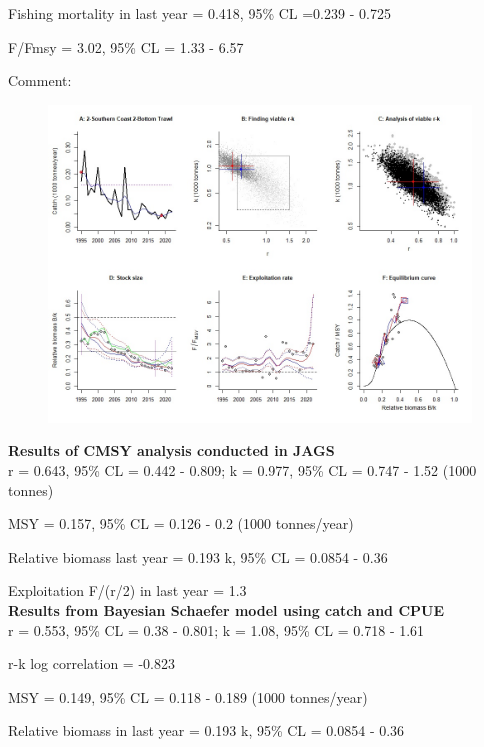 \documentclass[12pt,a4paper]{article}\usepackage[]{graphicx}\usepackage[]{xcolor}
\begin{document}
Fishing mortality in last year = 0.418, 95\% CL =0.239 - 0.725

F/Fmsy  = 3.02, 95\% CL = 1.33 - 6.57 

 Comment:  

    \pagebreak

    \begin{figure}[ht]
    \centering
    \includegraphics[width=1.00\textwidth ext=.jpg type=jpg]{2-Southern Coast 2-Bottom Trawl_AN.jpg}
    \end{figure}

    \textbf{Results of CMSY analysis conducted in JAGS}\\

r = 0.643, 95\% CL = 0.442 - 0.809; k = 0.977, 95\% CL = 0.747 - 1.52 (1000 tonnes)

MSY = 0.157, 95\% CL = 0.126 - 0.2 (1000 tonnes/year)

Relative biomass last year = 0.193 k, 95\% CL = 0.0854 - 0.36

Exploitation F/(r/2) in last year = 1.3 \\

\textbf{Results from Bayesian Schaefer model using catch and CPUE}\\

r = 0.553, 95\% CL = 0.38 - 0.801; k = 1.08, 95\% CL = 0.718 - 1.61

r-k log correlation = -0.823

MSY = 0.149, 95\% CL = 0.118 - 0.189 (1000 tonnes/year)

Relative biomass in last year = 0.193 k, 95\% CL = 0.0854 - 0.36
\end{document}
